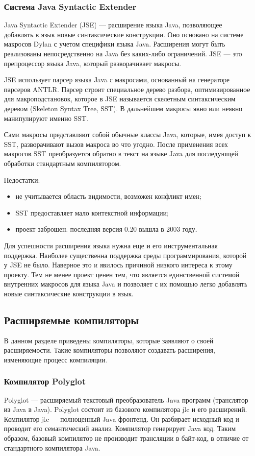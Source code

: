 \documentclass[a4paper,12pt,titlepage]{extarticle}
\begin{document}
\subsubsection*{Система Java Syntactic Extender}
\label{jse}
Java Syntactic Extender (JSE) --- расширение языка Java, позволяющее добавлять в
язык новые синтаксические конструкции. Оно основано на системе макросов Dylan с
учетом специфики языка Java. Расширения могут быть реализованы
непосредственно на Java без каких-либо ограничений. JSE --- это
препроцессор языка Java, который разворачивает макросы.

JSE использует парсер языка Java с макросами, основанный на генераторе парсеров
ANTLR. Парсер строит специальное дерево разбора, оптимизированное для
макроподстановок, которое в JSE называется скелетным синтаксическим деревом
(Skeleton Syntax Tree, SST). В дальнейшем макросы явно или неявно манипулируют
именно SST.

Сами макросы представляют собой обычные классы Java, которые, имея доступ к
SST, разворачивают вызов макроса во что угодно. После применения всех макросов
SST преобразуется обратно в текст на языке Java для последующей обработки
стандартным компилятором.

Недостатки:
\begin{itemize}
 \item не учитывается область видимости, возможен конфликт имен;
 \item SST предоставляет мало контекстной информации;
 \item проект заброшен. последняя версия 0.20 вышла в 2003 году.
\end{itemize}
Для успешности расширения языка нужна еще и его инструментальная поддержка.
Наиболее существенна поддержка среды программирования, которой у JSE не было.
Наверное это и явилось причиной низкого интереса к этому проекту.
Тем не менее проект ценен тем, что является единственной системой внутренних
макросов для языка Java и позволяет с их помощью легко добавлять
новые синтаксические конструкции в язык.

\subsection{Расширяемые компиляторы}
\label{extcomp}
В данном разделе приведены компиляторы, которые заявляют о своей расширяемости.
Такие компиляторы позволяют создавать расширения, изменяющие процесс
компиляции.

\subsubsection*{Компилятор Polyglot}
Polyglot --- расширяемый текстовый преобразователь Java программ (транслятор из
Java в Java). Polyglot состоит из базового компилятора jlc и его расширений.
Компилятор jlc --- полноценный Java фронтенд. Он разбирает исходный код и
проводит его семантический анализ. Компилятор генерирует 
Java код. Таким образом, базовый компилятор не производит трансляции в байт-код, в
отличие от стандартного компилятора Java.
\end{document}

